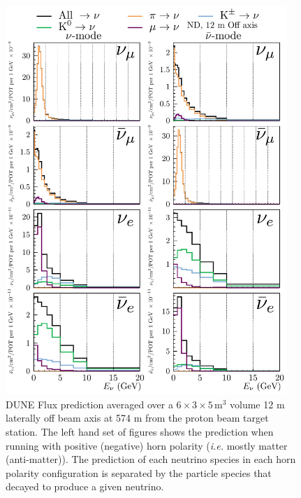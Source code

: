 \documentclass{article}
\begin{document}
\begin{figure}
  \centering
  \includegraphics[width=0.95\textwidth]{plots/fluxpredcompvar/ND_HadronParentFluxComponents_12m_offaxis}
  \caption{DUNE Flux prediction averaged over a $6\times 3\times 5\,\textrm{m}^{3}$ volume 12 m laterally off beam axis at 574 m from the proton beam target station. The left hand set of figures shows the prediction when running with positive (negative) horn polarity (\textit{i.e.} mostly matter (anti-matter)). The prediction of each neutrino species in each horn polarity configuration is separated by the particle species that decayed to produce a given neutrino.}
\end{figure}
\end{document}
